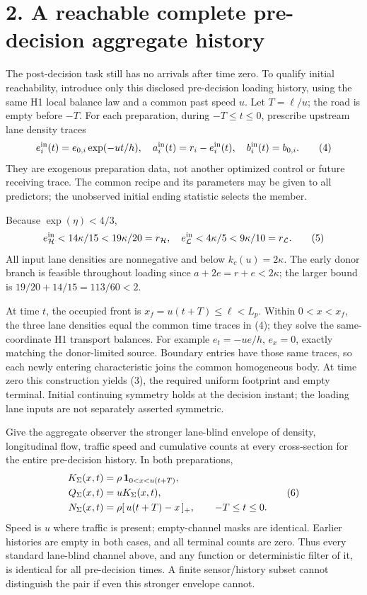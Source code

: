\documentclass[11pt,a4paper]{article}
\begin{document}
\section*{2. A reachable complete pre-decision aggregate history}
The post-decision task still has no arrivals after time zero.
To qualify initial reachability, introduce only this disclosed pre-decision
loading history, using the same H1 local balance law and a common past speed
$u$. Let $T=\ell/u$; the road is empty before $-T$.
For each preparation, during $-T\leq t\leq0$, prescribe upstream lane
density traces
\[
 e^{\rm in}_i(t)=e_{0,i}\exp(-ut/h),\quad
 a^{\rm in}_i(t)=r_i-e^{\rm in}_i(t),\quad
 b^{\rm in}_i(t)=b_{0,i}.
 \tag{4}
\]
They are exogenous preparation data, not another optimized control or future
receiving trace. The common recipe and its parameters may be given to all
predictors; the unobserved initial ending statistic selects the member.

Because $\exp(\eta)<4/3$,
\[
 e_{\mathcal H}^{\rm in}<14\kappa/15<19\kappa/20=r_{\mathcal H},
 \quad
 e_{\mathcal L}^{\rm in}<4\kappa/5<9\kappa/10=r_{\mathcal L}.
 \tag{5}
\]
All input lane densities are nonnegative and below $k_c(u)=2\kappa$.
The early donor branch is feasible throughout loading since
$a+2e=r+e<2\kappa$; the larger bound is
$19/20+14/15=113/60<2$.

At time $t$, the occupied front is $x_f=u(t+T)\leq\ell<L_p$.
Within $0<x<x_f$, the three lane densities equal the common time traces
in (4); they solve the same-coordinate H1 transport balances.
For example $e_t=-ue/h$, $e_x=0$, exactly matching the donor-limited
source. Boundary entries have those same traces, so each newly entering
characteristic joins the common homogeneous body. At time zero this
construction yields (3), the required uniform footprint and empty terminal.
Initial continuing symmetry holds at the decision instant; the loading
lane inputs are not separately asserted symmetric.

Give the aggregate observer the stronger lane-blind envelope of density,
longitudinal flow, traffic speed and cumulative counts at every cross-section
for the entire pre-decision history. In both preparations,
\[
 \begin{split}
 K_\Sigma(x,t)&=\rho\,{\bf1}_{0<x<u(t+T)},\\
 Q_\Sigma(x,t)&=uK_\Sigma(x,t),\\
 N_\Sigma(x,t)&=\rho[\,u(t+T)-x\,]_+,\qquad -T\leq t\leq0 .
 \end{split}
 \tag{6}
\]
Speed is $u$ where traffic is present; empty-channel masks are identical.
Earlier histories are empty in both cases, and all terminal counts are zero.
Thus every standard lane-blind channel above, and any function or deterministic
filter of it, is identical for all pre-decision times. A finite sensor/history
subset cannot distinguish the pair if even this stronger envelope cannot.
\end{document}
